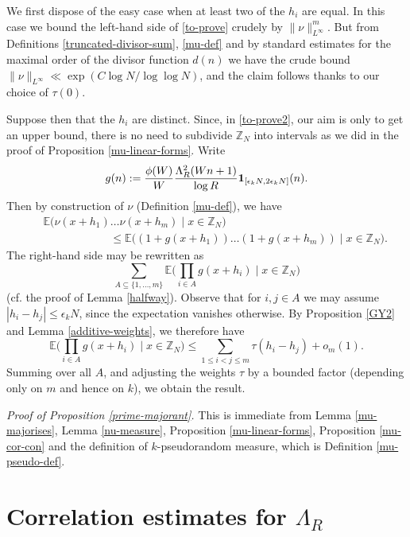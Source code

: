 \documentclass[12pt,a4paper,reqno]{amsart}
\numberwithin{equation}{section}
\theoremstyle{plain}
\theoremstyle{definition}
\renewcommand{\leq}{\leqslant}
\def\vs{\vspace{11pt}}
\def\ni{\noindent}
\def\endproof{\hfill{\usebox{\proofbox}}}
\begin{document}
\ni We first dispose of the easy case when at least two of the $h_i$ are equal.  In this case we bound the left-hand side
of \eqref{to-prove} crudely by $\| \nu \|_{L^\infty}^m$.  But from Definitions \ref{truncated-divisor-sum}, \ref{mu-def}
and by standard estimates for the maximal order of the divisor function $d(n)$ we have the crude bound
$\| \nu \|_{L^\infty} \ll \exp(C\log N/\log \log N)$, and the claim follows thanks to our choice of $\tau(0)$.\vs

\ni Suppose then that the $h_i$ are distinct. Since, in \eqref{to-prove2}, our aim is only to get an upper bound, there is no need to subdivide $\mathbb{Z}_N$ into intervals as we did in the proof of Proposition \ref{mu-linear-forms}.
Write 
$$g(n) := \frac{\phi(W)}{W} \frac{\Lambda_R^2(Wn+1)}{\log R} {\bf 1}_{[\epsilon_k N, 2\epsilon_k N]}(n).$$
Then by construction of $\nu$ (Definition \ref{mu-def}), we have
\begin{eqnarray*} &&\mathbb{E}\big(\nu(x + h_1) \dots \nu(x+h_m) \; \big| \; x \in \mathbb{Z}_N\big) \\ && \qquad\qquad\qquad\leq  \mathbb{E}\big((1 + g(x + h_1)) \dots (1 + g(x+h_m)) \; \big| \; x \in \mathbb{Z}_N\big).\end{eqnarray*}
The right-hand side may be rewritten as
\[ \sum_{A \subseteq \{1,\ldots,m\}}  \mathbb{E}\bigg( \prod_{i \in A} g(x+h_i) \; \bigg| \; x \in \mathbb{Z}_N\bigg)\]
(cf. the proof of Lemma \ref{halfway}).  Observe that for $i,j \in A$ we may assume $|h_i - h_j| \leq \epsilon_k N$, since
the expectation vanishes otherwise.  By Proposition \ref{GY2} and Lemma \ref{additive-weights}, we therefore have
\[ \mathbb{E}\bigg( \prod_{i \in A} g(x+h_i) \; \bigg| \; x \in \mathbb{Z}_N\bigg) \leq \sum_{1 \leq i < j \leq m} \tau(h_i - h_j) + o_m(1).\] 
Summing over all $A$, and adjusting the weights $\tau$ by a bounded factor (depending only on $m$ and hence on $k$), we obtain the result.
\endproof\vspace{11pt}

\noindent\textit{Proof of Proposition \ref{prime-majorant}.} This is immediate from Lemma \ref{mu-majorises}, Lemma \ref{nu-measure}, Proposition \ref{mu-linear-forms}, Proposition \ref{mu-cor-con} and the definition of $k$-pseudorandom measure, which is Definition \ref{mu-pseudo-def}.\endproof

\section{Correlation estimates for $\Lambda_R$}\label{sec9}
\end{document}
